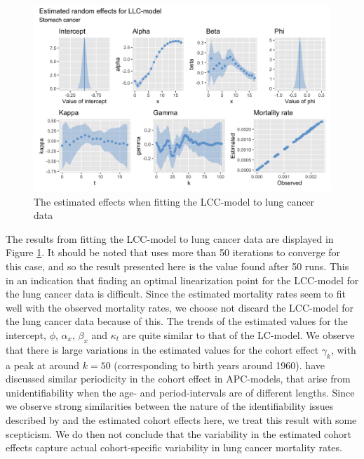 \begin{figure}[h!]
    \centering
    \includegraphics[width=0.85\linewidth]{real-data/real-data-univariate/Figures/uv-full-data-lcc-l.png}
    \caption{The estimated effects when fitting the LCC-model to lung cancer data}
    \label{fig:uv-full-data-LCC-l}
\end{figure}

\newpar The results from fitting the LCC-model to lung cancer data are displayed in Figure \ref{fig:uv-full-data-LCC-l}. It should be noted that \inlabru uses more than 50 iterations to converge for this case, and so the result presented here is the value found after 50 runs. This in an indication that finding an optimal linearization point for the LCC-model for the lung cancer data is difficult. Since the estimated mortality rates seem to fit well with the observed mortality rates, we choose not discard the LCC-model for the lung cancer data because of this. The trends of the estimated values for the intercept, $\phi$, $\alpha_x$, $\beta_x$ and $\kappa_t$ are quite similar to that of the LC-model. We observe that there is large variations in the estimated values for the cohort effect $\gamma_k$, with a peak at around $k = 50$ (corresponding to birth years around 1960). \textcite{RieblerThesis2010} have discussed similar periodicity in the cohort effect in APC-models, that arise from unidentifiability when the age- and period-intervals are of different lengths. Since we observe strong similarities between the nature of the identifiability issues described by \textcite{RieblerThesis2010} and the estimated cohort effects here, we treat this result with some scepticism. We do then not conclude that the variability in the estimated cohort effects capture actual cohort-specific variability in lung cancer mortality rates. 

